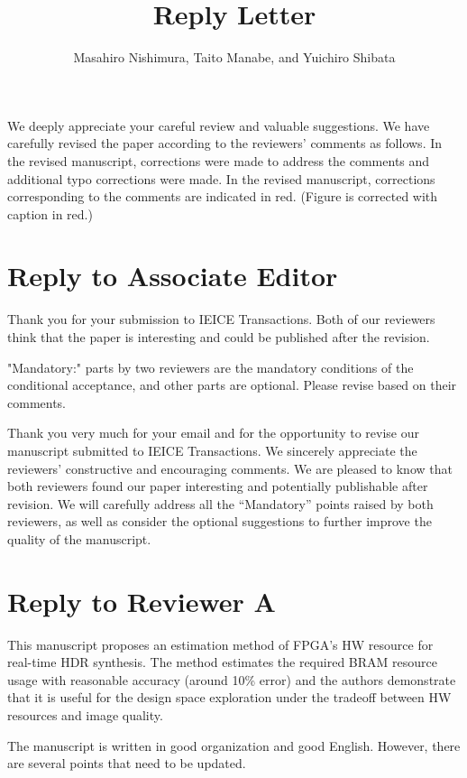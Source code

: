\documentclass[a4j]{jsarticle}
\title{\bf \Large Reply Letter}
\author{Masahiro Nishimura, Taito Manabe, and Yuichiro Shibata}
\date{}
\begin{document}
\maketitle

We deeply appreciate your careful review and valuable suggestions.  
We have carefully revised the paper according to the reviewers' 
comments as follows.
In the revised manuscript, corrections were made to address the comments 
and additional typo corrections were made.
In the revised manuscript, corrections corresponding to the comments are indicated in red.
(Figure is corrected with caption in red.)

\section*{Reply to Associate Editor}
\begin{screen}
Thank you for your submission to IEICE Transactions. Both of our reviewers
think that the paper is interesting and could be published after the revision. 

"Mandatory:" parts by two reviewers are the mandatory conditions
of the conditional acceptance, and other parts are optional.
Please revise based on their comments.
\end{screen}
Thank you very much for your email and for the opportunity to revise 
our manuscript submitted to IEICE Transactions.
We sincerely appreciate the reviewers’ constructive and encouraging comments.
We are pleased to know that both reviewers found our paper interesting and 
potentially publishable after revision.
We will carefully address all the “Mandatory” points raised by both reviewers, 
as well as consider the optional suggestions to further improve the quality of 
the manuscript.


\section*{Reply to Reviewer A}

\begin{screen}
This manuscript proposes an estimation method of FPGA's HW resource for real-time HDR synthesis.
The method estimates the required BRAM resource usage with reasonable accuracy (around 10\% error)
and the authors demonstrate that it is useful for the design space exploration
under the tradeoff between HW resources and image quality.

The manuscript is written in good organization and good English.
However, there are several points that need to be updated.
\end{screen}
\end{document}
